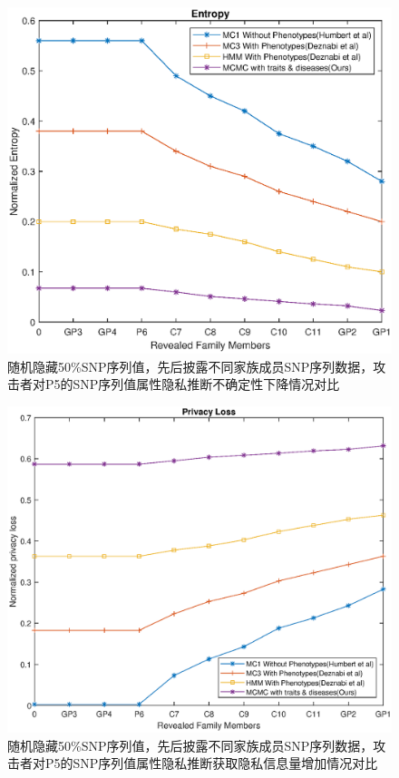 \begin{figure}[htbp]
	\centering
	\includegraphics[width=0.8\linewidth]{./figures/P5entropy1.eps}
	\centering
	\caption{随机隐藏50\%SNP序列值，先后披露不同家族成员SNP序列数据，攻击者对P5的SNP序列值属性隐私推断不确定性下降情况对比}\label{fig:P5entropy1}
\end{figure}

\begin{figure}[htbp]
	\centering
	\includegraphics[width=0.8\linewidth]{./figures/P5privacyloss1.eps}
	\centering
	\caption{随机隐藏50\%SNP序列值，先后披露不同家族成员SNP序列数据，攻击者对P5的SNP序列值属性隐私推断获取隐私信息量增加情况对比}\label{fig:P5privacyloss1}
\end{figure}


